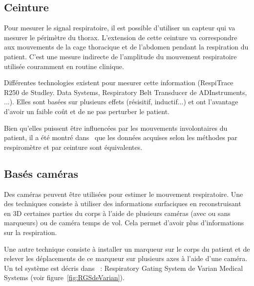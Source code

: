 \subsection{Ceinture}

Pour mesurer le signal respiratoire, il est possible d'utiliser un capteur qui va mesurer le périmètre du thorax. L'extension de cette ceinture va correspondre aux mouvements de la cage thoracique et de l'abdomen pendant la respiration du patient. C'est une mesure indirecte de l'amplitude du mouvement respiratoire utilisée couramment en routine clinique. 

Différentes technologies existent pour mesurer cette information (RespiTrace R250 de Studley. Data Systems, Respiratory Belt Transducer de ADInstruments, ...). Elles sont basées sur plusieurs effets (résisitif, inductif...) et ont l'avantage d'avoir un faible coût et de ne pas perturber le patient.

Bien qu'elles puissent être influencées par les mouvements involontaires du patient, il a été montré dans~\cite{Guivarch2004Sync} que les données acquises selon les méthodes par respiromètre et par ceinture sont équivalentes.

\subsection{Basés caméras}

Des caméras peuvent être utilisées pour estimer le mouvement respiratoire. Une des techniques consiste à utiliser des informations surfaciques en reconstruisant en 3D certaines parties du corps à l'aide de plusieurs caméras (avec ou sans marqueurs) ou de caméra temps de vol. Cela permet d'avoir plus d'informations sur la respiration.

Une autre technique consiste à installer un marqueur sur le corps du patient et de relever les déplacements de ce marqueur sur plusieurs axes à l'aide d'une caméra. Un tel système est décris dans~\cite{nehmeh2002effect} : Respiratory Gating System de Varian Medical Systems (voir figure~\ref{fig:RGSdeVarian}).


